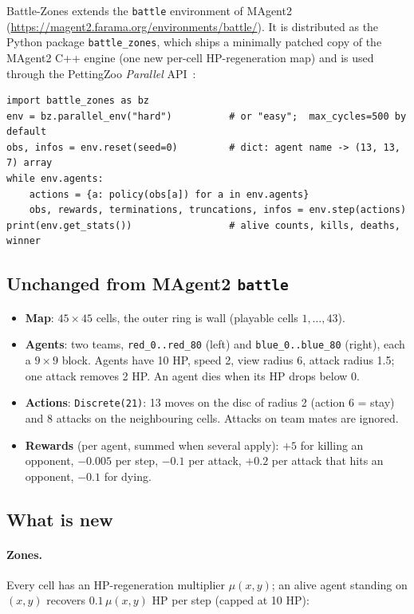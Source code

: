 \documentclass[11pt,a4paper]{article}
\newcommand{\code}[1]{\texttt{#1}}
\begin{document}
Battle-Zones extends the \code{battle} environment of MAgent2~\cite{magent,magent2}
(\url{https://magent2.farama.org/environments/battle/}).  It is distributed as the Python
package \code{battle\_zones}, which ships a minimally patched copy of the MAgent2 C++ engine
(one new per-cell HP-regeneration map) and is used through the PettingZoo
\emph{Parallel} API~\cite{pettingzoo}:

\begin{lstlisting}
import battle_zones as bz
env = bz.parallel_env("hard")          # or "easy";  max_cycles=500 by default
obs, infos = env.reset(seed=0)         # dict: agent name -> (13, 13, 7) array
while env.agents:
    actions = {a: policy(obs[a]) for a in env.agents}
    obs, rewards, terminations, truncations, infos = env.step(actions)
print(env.get_stats())                 # alive counts, kills, deaths, winner
\end{lstlisting}

\subsection{Unchanged from MAgent2 \code{battle}}

\begin{itemize}
  \item \textbf{Map}: $45\times45$ cells, the outer ring is wall (playable cells
        $1,\dots,43$).
  \item \textbf{Agents}: two teams, \code{red\_0..red\_80} (left) and
        \code{blue\_0..blue\_80} (right), each a $9\times9$ block.  Agents have 10 HP,
        speed 2, view radius 6, attack radius 1.5; one attack removes 2 HP.  An agent
        dies when its HP drops below 0.
  \item \textbf{Actions}: \code{Discrete(21)}: 13 moves on the disc of radius 2 (action
        6 = stay) and 8 attacks on the neighbouring cells.  Attacks on team mates are
        ignored.
  \item \textbf{Rewards} (per agent, summed when several apply): $+5$ for killing an
        opponent, $-0.005$ per step, $-0.1$ per attack, $+0.2$ per attack that hits an
        opponent, $-0.1$ for dying.
\end{itemize}

\subsection{What is new}

\paragraph{Zones.}
Every cell has an HP-regeneration multiplier $\mu(x,y)$; an alive agent standing on
$(x,y)$ recovers $0.1\,\mu(x,y)$ HP per step (capped at 10 HP):
\end{document}
